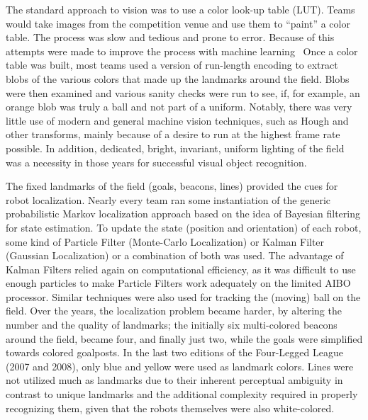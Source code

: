 \documentclass{llncs}
\begin{document}
The standard approach to vision was to use a color look-up table (LUT).
Teams would take images from the competition venue and use them to
``paint'' a color table. The process was slow and tedious and prone to error.
Because of this attempts were made to improve the process with machine
learning~\cite{bruce-00,quinlan-04}
Once a color table was built, most teams used a version of run-length encoding
to extract blobs of the various colors that made up the landmarks around the field.
Blobs were then examined and various sanity checks were run to see, if,
for example, an orange blob was truly a ball and not part of a uniform.
Notably, there was very little use of modern and general machine vision techniques,
such as Hough and other transforms, mainly because of a desire to run at the
highest frame rate possible. In addition, dedicated, bright, invariant, uniform
lighting of the field was a necessity in those years for successful visual object recognition. 

The fixed landmarks of the field (goals, beacons, lines) provided the cues for robot localization. 
Nearly every team ran some instantiation of the generic probabilistic Markov localization approach based on the idea of Bayesian filtering for state estimation. 
To update the state (position and orientation) of each robot, some kind of Particle Filter (Monte-Carlo
Localization) or Kalman Filter (Gaussian Localization) or a combination of both was used. The advantage of Kalman Filters 
relied again on computational efficiency, as it was difficult to use enough
particles to make Particle Filters work adequately on the limited 
AIBO processor. 
Similar techniques were also used for tracking the (moving) ball on the field. 
Over the years, the localization problem became harder, by altering 
the number and the quality of landmarks; the initially six multi-colored beacons 
around the field, became four, and finally just two, while the goals were 
simplified towards colored goalposts. In the last two editions 
of the Four-Legged League (2007 and 2008), only blue and yellow were used as landmark colors. 
Lines were not utilized much as landmarks due to their inherent perceptual ambiguity 
in contrast to unique landmarks and the additional complexity required 
in properly recognizing them, given that the robots themselves were also white-colored. 
\end{document}
